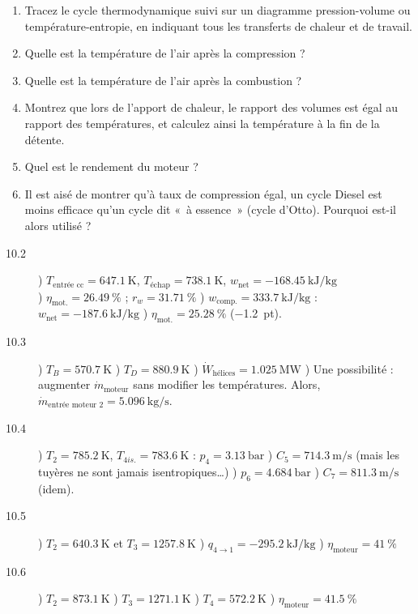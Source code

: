 	\begin{enumerate}
		\item Tracez le cycle thermodynamique suivi sur un diagramme pression-volume ou tem\-pérature-entropie, en indiquant tous les transferts de chaleur et de travail.
		\item Quelle est la température de l’air après la compression ?
		\item Quelle est la température de l’air après la combustion ?
		\item Montrez que lors de l’apport de chaleur, le rapport des volumes est égal au rapport des températures, et calculez ainsi la température à la fin de la détente.
		\item Quel est le rendement du moteur ?
		\item Il est aisé de montrer qu’à taux de compression égal, un cycle Diesel est moins efficace qu’un cycle dit «~à essence~» (cycle d’Otto). Pourquoi est-il alors utilisé ?
	\end{enumerate}

\exercisesolutionpage
\titreresultats
	\linktosolutionsblurb
	
	\begin{description}
		\item [10.2] 
	 		) $T_\text{entrée cc} = \SI{647,1}{\kelvin}$, $T_\text{échap} = \SI{738,1}{\kelvin}$, $w_\text{net} = \SI{-168,45}{\kilo\joule\per\kilogram}$ \\
	 		) $\eta_\text{mot.} = \SI{26,49}{\percent}$ ; $r_{w} = \SI{31,71}{\percent}$ 
	 		) $w_\text{comp.} = \SI{+333,7}{\kilo\joule\per\kilogram}$ :\\ $w_\text{net} = \SI{-187,6}{\kilo\joule\per\kilogram}$ 
	 		) $\eta_\text{mot.} = \SI{25,28}{\percent}$ (\SI{-1,2}{pt}).
		\item [10.3] 
	 		) $T_{B} = \SI{570,7}{\kelvin}$ 
	 		) $T_{D} = \SI{880,9}{\kelvin}$ 
	 		) $\dot{W}_\text{hélices} = \SI{1,025}{\mega\watt}$ 
	 		) Une possibilité : augmenter $\dot{m}_\text{moteur}$ sans modifier les températures. Alors, $\dot{m}_\text{entrée~moteur~2} = \SI{5,096}{\kilogram\per\second}$.
		\item [10.4] 
	 		) $T_{2} = \SI{785,2}{\kelvin}$, $T_{4is.} = \SI{783,6}{\kelvin}$ : $p_4 = \SI{3,13}{\bar}$ 
	 		) $C_{5} = \SI{714,3}{\metre\per\second}$ (mais les tuyères ne sont jamais isentropiques…)
	 		) $p_6 = \SI{4,684}{\bar}$ 
	 		) $C_{7}= \SI{811,3}{\metre\per\second}$ (idem).
		\item [10.5] 
	 		) $T_{2} = \SI{640,3}{\kelvin}$ et $T_{3} = \SI{1257,8}{\kelvin}$ 
	 		) $q_{4\to 1} = \SI{-295,2}{\kilo\joule\per\kilogram}$
	 		) $\eta_\text{moteur} = \SI{41}{\percent}$
	 	\item [10.6]
	 		) $T_{2} = \SI{873,1}{\kelvin}$
	 		) $T_{3} = \SI{1271,1}{\kelvin}$ 
	 		) $T_{4} = \SI{572,2}{\kelvin}$
	 		) $\eta_\text{moteur} = \SI{41,5}{\percent}$
	\end{description}

